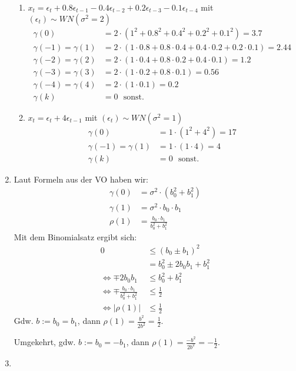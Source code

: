 \documentclass[a4paper,11pt,notitlepage,fullpage]{article}
\begin{document}
\begin{enumerate}
\begin{enumerate}
\item $x_t = \epsilon_t + 0.8 \epsilon_{t-1} - 0.4 \epsilon_{t-2} + 0.2 \epsilon_{t-3} - 0.1 \epsilon_{t-4}$ mit $(\epsilon_t) \sim WN(\sigma^2 = 2)$
\begin{align*}
\gamma(0) &= 2 \cdot (1^2 + 0.8^2 + 0.4^2 + 0.2^2 + 0.1^2) = 3.7 \\
\gamma(-1) = \gamma(1) &= 2 \cdot (1 \cdot 0.8+ 0.8 \cdot 0.4 + 0.4 \cdot 0.2 + 0.2 \cdot 0.1) = 2.44 \\
\gamma(-2) = \gamma(2) &= 2 \cdot (1 \cdot 0.4+ 0.8 \cdot 0.2 + 0.4 \cdot 0.1) = 1.2 \\
\gamma(-3) = \gamma(3) &= 2 \cdot (1 \cdot 0.2+ 0.8 \cdot 0.1) = 0.56 \\
\gamma(-4) = \gamma(4) &= 2 \cdot (1 \cdot 0.1) = 0.2 \\
\gamma(k) &= 0~~~\text{sonst.}
\end{align*}

\item $x_t = \epsilon_t + 4 \epsilon_{t-1}$ mit $(\epsilon_t) \sim WN(\sigma^2 = 1)$
\begin{align*}
\gamma(0) &= 1 \cdot (1^2 + 4^2) = 17 \\
\gamma(-1) = \gamma(1) &= 1 \cdot (1 \cdot 4) = 4 \\
\gamma(k) &= 0~~~\text{sonst.}
\end{align*}
\end{enumerate}

\item Laut Formeln aus der VO haben wir:
\begin{align*}
\gamma(0) &= \sigma^2 \cdot (b_0^2 + b_1^2) \\
\gamma(1) &= \sigma^2 \cdot b_0 \cdot b_1 \\
\rho(1) &= \frac{b_0 \cdot b_1}{b_0^2 + b_1^2}
\end{align*}
Mit dem Binomialsatz ergibt sich:
\begin{align*}
0 &\leq (b_0 \pm b_1)^2 \\
&= b_0^2 \pm 2b_0b_1 + b_1^2 \\
\Leftrightarrow \mp 2b_0b_1 &\leq b_0^2 + b_1^2 \\
\Leftrightarrow \mp \frac{b_0 \cdot b_1}{b_0^2 + b_1^2} &\leq \frac{1}{2} \\
\Leftrightarrow |\rho(1)| &\leq \frac{1}{2}
\end{align*}
Gdw. $b := b_0 = b_1$, dann $\rho(1) = \frac{b^2}{2b^2} = \frac{1}{2}$.

Umgekehrt, gdw. $b := b_0 = -b_1$, dann $\rho(1) = \frac{-b^2}{2b^2} = -\frac{1}{2}$.

\item

\end{enumerate}
\end{document}
